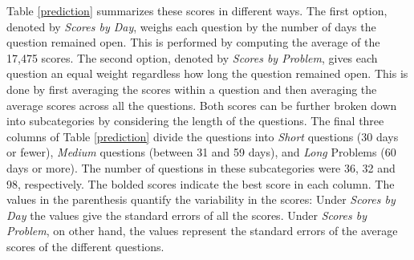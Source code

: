 \documentclass[aoas, preprint]{imsart}
\numberwithin{equation}{section}
\theoremstyle{plain}
\begin{document}
Table \ref{prediction} summarizes these scores in different ways. The first option, denoted by \textit{Scores by Day}, weighs each question by the number of days the question remained open. This is performed by computing the average of the 17,475 scores. The second option, denoted by \textit{Scores by Problem}, gives each question an equal weight regardless how long the question remained open. This is done by first averaging the scores within a question and then averaging the average scores across all the questions. Both scores can be further broken down into subcategories by considering the length of the questions. The final three columns of Table \ref{prediction} divide the questions into \textit{Short} questions (30 days or fewer), \textit{Medium} questions (between 31 and 59 days), and \textit{Long} Problems (60 days or more). The number of questions in these subcategories were 36, 32 and 98, respectively. The bolded scores indicate the best score in each column. The values in the parenthesis quantify the variability in the scores: Under \textit{Scores by Day} the values give the standard errors of all the scores. Under \textit{Scores by Problem}, on other hand, the values represent the standard errors of the average scores of the different questions. 
\end{document}
